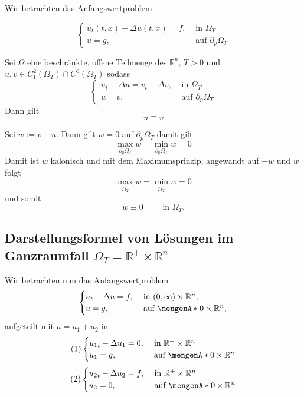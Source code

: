 
Wir betrachten das Anfangswertproblem

\[
	\begin{cases}
		u_t(t,x) - \Delta u(t,x) = f, &\text{ in }\Omega_T\\
		u = g, &\text{ auf }\partial_p \Omega_T
	\end{cases}
\]

\begin{korollar}[Eindeutigkeit]
	Sei $\Omega$ eine beschränkte, offene Teilmenge des $\mathbb{R}^n$, $T>0$ und $u,v \in C_1^2(\Omega_T) \cap C^0(\Omega_T)$ sodass
	\[
		\begin{cases}
			u_t- \Delta u = v_t - \Delta v, &\text{ in }\Omega_T\\
			u = v ,&\text{ auf } \partial_p \Omega_T
		\end{cases}
	\]
	Dann gilt \[
		u \equiv v
	\]
\end{korollar}
\begin{beweis}
	Sei $w:= v-u$. Dann gilt $w=0$ auf $ \partial_p \Omega_T$ damit gilt
	\[
		\max_{ \partial_p \Omega_T} w = \min_{ \partial_p \Omega_T} w = 0
	\]
	Damit ist $w$ kalonisch und mit dem Maximumsprinzip, angewandt auf $-w$ und $w$ folgt
	\[
		\max_{\bar{\Omega}_T} w = \min_{\bar{\Omega}_T} w = 0
	\]
	und somit
	\[
		w \equiv 0 \qquad \text{ in } \Omega_T.
	\]
\end{beweis}

\subsection{Darstellungsformel von Lösungen im Ganzraumfall $\Omega_T = \mathbb{R}^{+} \times \mathbb{R}^n$} 
\label{sub:darstellungsformel_von_losungen_im_ganzraumfall_omega_t_mathbb_r_times_mathbb_r_n}
Wir betrachten nun das Anfangswertproblem 
\[
	\begin{cases}
		u_t - \Delta u = f , &\text{ in }(0,\infty) \times \mathbb{R}^n,\\
		u = g, &\text{ auf } \set{0} \times \mathbb{R}^n,
	\end{cases}
\]
aufgeteilt mit $u = u_1 + u_2$ in 
\[
	(1)\begin{cases}
		{u_1}_t - \Delta u_1 = 0, &\text{ in }\mathbb{R}^{+} \times \mathbb{R}^n\\
		u_1 = g, &\text{ auf } \set{0} \times \mathbb{R}^n
	\end{cases}
\]
\[
	(2)\begin{cases}
		{u_2}_t - \Delta u_2 = f, &\text{ in }\mathbb{R}^{+} \times \mathbb{R}^n\\
		u_2 = 0, &\text{ auf } \set{0} \times \mathbb{R}^n
	\end{cases}
\]

